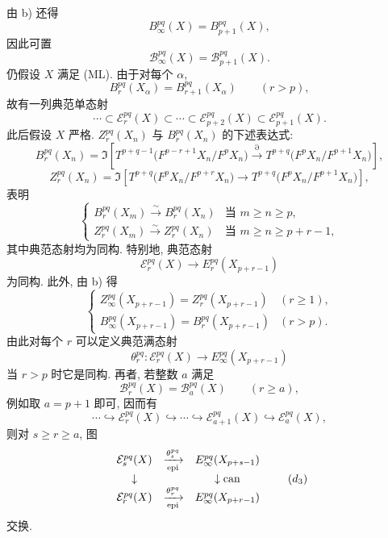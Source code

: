 由 b) 还得
\[
B_\infty^{pq}(X)=B_{p+1}^{pq}(X),
\]
因此可置
\[
\mathcal B_\infty^{pq}(X)=\mathcal B_{p+1}^{pq}(X).
\]
仍假设 \(X\) 满足 (ML). 由于对每个 \(\alpha\),
\[
B_r^{pq}(X_\alpha)=B_{r+1}^{pq}(X_\alpha)\qquad(r>p),
\]
故有一列典范单态射
\begin{equation}
\cdots\subset\mathcal E_r^{pq}(X)\subset\cdots\subset\mathcal E_{p+2}^{pq}(X)\subset\mathcal E_{p+1}^{pq}(X).
\tag{S}
\end{equation}
此后假设 \(X\) 严格. \(Z_r^{pq}(X_n)\) 与 \(B_r^{pq}(X_n)\) 的下述表达式:
\[
B_r^{pq}(X_n)=
\Im\!\left[
T^{p+q-1}\bigl(F^{p-r+1}X_n/F^pX_n\bigr)
\xrightarrow{\partial}
T^{p+q}\bigl(F^pX_n/F^{p+1}X_n\bigr)
\right],
\]
\[
Z_r^{pq}(X_n)=
\Im\!\left[
T^{p+q}\bigl(F^pX_n/F^{p+r}X_n\bigr)
\longrightarrow
T^{p+q}\bigl(F^pX_n/F^{p+1}X_n\bigr)
\right],
\]
表明
\begin{equation}
\left\{
\begin{array}{ll}
B_r^{pq}(X_m)\xrightarrow{\sim}B_r^{pq}(X_n)&\text{当 }m\ge n\ge p,\\[3pt]
Z_r^{pq}(X_m)\xrightarrow{\sim}Z_r^{pq}(X_n)&\text{当 }m\ge n\ge p+r-1,
\end{array}
\right.
\tag{\(d_1\)}
\end{equation}
其中典范态射均为同构. 特别地, 典范态射
\[
\mathcal E_r^{pq}(X)\longrightarrow E_r^{pq}(X_{p+r-1})
\]
为同构. 此外, 由 b) 得
\begin{equation}
\left\{
\begin{array}{ll}
Z_\infty^{pq}(X_{p+r-1})=Z_r^{pq}(X_{p+r-1})&(r\ge1),\\[3pt]
B_\infty^{pq}(X_{p+r-1})=B_r^{pq}(X_{p+r-1})&(r>p).
\end{array}
\right.
\tag{\(d_2\)}
\end{equation}
由此对每个 \(r\) 可以定义典范满态射
\[
\theta_r^{pq}:\mathcal E_r^{pq}(X)\longrightarrow E_\infty^{pq}(X_{p+r-1})
\]
当 \(r>p\) 时它是同构. 再者, 若整数 \(a\) 满足
\[
\mathcal B_r^{pq}(X)=\mathcal B_a^{pq}(X)\qquad(r\ge a),
\]
例如取 \(a=p+1\) 即可, 因而有
\begin{equation}
\cdots\hookrightarrow\mathcal E_r^{pq}(X)\hookrightarrow\cdots\hookrightarrow
\mathcal E_{a+1}^{pq}(X)\hookrightarrow\mathcal E_a^{pq}(X),
\tag{S bis}
\end{equation}
则对 \(s\ge r\ge a\), 图
\begin{equation}
\begin{array}{ccc}
\mathcal E_s^{pq}(X)&\xrightarrow[\operatorname{epi}]{\theta_s^{pq}}&E_\infty^{pq}(X_{p+s-1})\\
\downarrow&&\downarrow\operatorname{can}\\
\mathcal E_r^{pq}(X)&\xrightarrow[\operatorname{epi}]{\theta_r^{pq}}&E_\infty^{pq}(X_{p+r-1})
\end{array}
\tag{\(d_3\)}
\end{equation}
交换.

